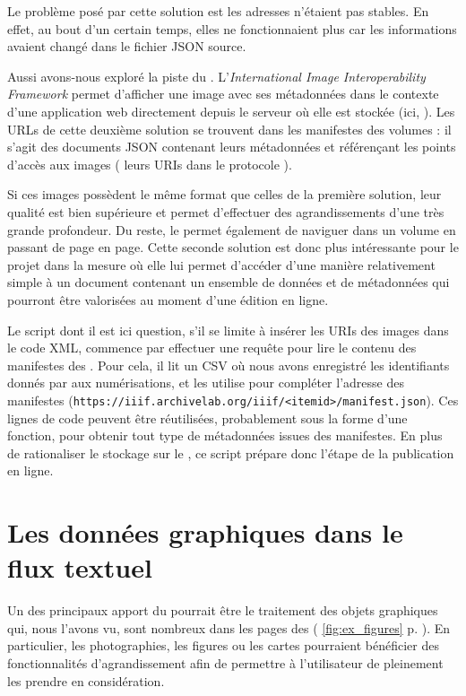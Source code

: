 Le problème posé par cette solution est les adresses n'étaient pas stables. En effet, au bout d'un certain temps, elles ne fonctionnaient plus car les informations avaient changé dans le fichier JSON source.

Aussi avons-nous exploré la piste du \iiif. L'\textit{International Image Interoperability Framework} permet d'afficher une image avec ses métadonnées dans le contexte d'une application web directement depuis le serveur où elle est stockée (ici, \ia). Les URLs de cette deuxième solution se trouvent dans les \og manifestes \iiif{} \fg{} des volumes : il s'agit des documents JSON contenant leurs métadonnées et référençant les points d'accès aux images (\cad{} leurs URIs dans le protocole \iiif).

Si ces images possèdent le même format que celles de la première solution, leur qualité est bien supérieure et permet d'effectuer des agrandissements d'une très grande profondeur. Du reste, le \iiif{} permet également de naviguer dans un volume en passant de page en page. Cette seconde solution est donc plus intéressante pour le projet \timeus{} dans la mesure où elle lui permet d'accéder d'une manière relativement simple à un document contenant un ensemble de données et de métadonnées qui pourront être valorisées au moment d'une édition en ligne.

Le script dont il est ici question, s'il se limite à insérer les URIs des images dans le code XML, commence par effectuer une requête pour lire le contenu des manifestes \iiif{} des \odm{}. Pour cela, il lit un CSV où nous avons enregistré les identifiants donnés par \ia{} aux numérisations, et les utilise pour compléter l'adresse des manifestes (\texttt{https://iiif.archivelab.org/iiif/<itemid>/manifest.json}). Ces lignes de code peuvent être réutilisées, probablement sous la forme d'une fonction, pour obtenir tout type de métadonnées issues des manifestes. En plus de rationaliser le stockage sur le \sharedocs{}, ce script prépare donc l'étape de la publication en ligne.

\section{Les données graphiques dans le flux textuel}

Un des principaux apport du \iiif{} pourrait être le traitement des objets graphiques qui, nous l'avons vu, sont nombreux dans les pages des \odm{} (\fig{} \ref{fig:ex_figures} p. \pageref{fig:ex_figures}). En particulier, les photographies, les figures ou les cartes pourraient bénéficier des fonctionnalités d'agrandissement afin de permettre à l'utilisateur de pleinement les prendre en considération.

